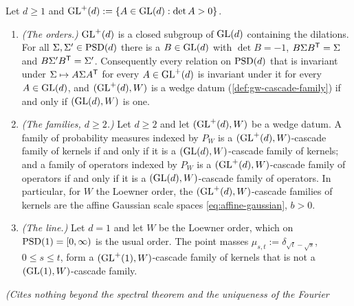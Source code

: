 \begin{proposition}
\label{prop:glplus-families}
\leanok
Let $d \ge 1$ and $\mathrm{GL}^+(d) := \{A \in \mathrm{GL}(d) : \det A > 0\}$.
\begin{enumerate}
\item \emph{(The orders.)} $\mathrm{GL}^+(d)$ is a closed subgroup of $\mathrm{GL}(d)$ containing the dilations. For
all $\Sigma, \Sigma' \in \mathrm{PSD}(d)$ there is a $B \in \mathrm{GL}(d)$ with $\det B = -1$, $B\Sigma B^{\mathsf{T}} = \Sigma$
and $B\Sigma'B^{\mathsf{T}} = \Sigma'$. Consequently every relation on $\mathrm{PSD}(d)$ that is invariant under
$\Sigma \mapsto A\Sigma A^{\mathsf{T}}$ for every $A \in \mathrm{GL}^+(d)$ is invariant under it for every
$A \in \mathrm{GL}(d)$, and $(\mathrm{GL}^+(d), W)$ is a wedge datum (\ref{def:gw-cascade-family}) if and only if
$(\mathrm{GL}(d), W)$ is one.
\item \emph{(The families, $d \ge 2$.)} Let $d \ge 2$ and let $(\mathrm{GL}^+(d), W)$ be a wedge datum. A
family of probability measures indexed by $P_W$ is a $(\mathrm{GL}^+(d), W)$-cascade family of kernels if and
only if it is a $(\mathrm{GL}(d), W)$-cascade family of kernels; and a family of operators indexed by $P_W$ is
a $(\mathrm{GL}^+(d), W)$-cascade family of operators if and only if it is a $(\mathrm{GL}(d), W)$-cascade family of
operators. In particular, for $W$ the Loewner order, the $(\mathrm{GL}^+(d), W)$-cascade families of kernels
are the affine Gaussian scale spaces \ref{eq:affine-gaussian}, $b > 0$.
\item \emph{(The line.)} Let $d = 1$ and let $W$ be the Loewner order, which on $\mathrm{PSD}(1) = [0,\infty)$
is the usual order. The point masses $\mu_{s,t} := \delta_{\sqrt t - \sqrt s}$, $0 \le s \le t$, form a
$(\mathrm{GL}^+(1), W)$-cascade family of kernels that is not a $(\mathrm{GL}(1), W)$-cascade family.
\end{enumerate}
\statusT\quad\emph{(Cites nothing beyond the spectral theorem and the uniqueness of the Fourier
}
\end{proposition}
